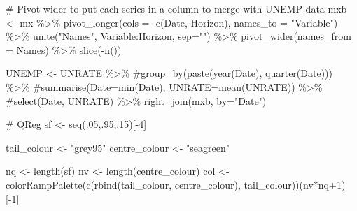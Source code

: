 \documentclass[
  letterpaper,
]{book}
\newenvironment{Shaded}{\begin{snugshade}}{\end{snugshade}}
\newcommand{\AttributeTok}[1]{\textcolor[rgb]{0.40,0.45,0.13}{#1}}
\newcommand{\CommentTok}[1]{\textcolor[rgb]{0.37,0.37,0.37}{#1}}
\newcommand{\DecValTok}[1]{\textcolor[rgb]{0.68,0.00,0.00}{#1}}
\newcommand{\FunctionTok}[1]{\textcolor[rgb]{0.28,0.35,0.67}{#1}}
\newcommand{\NormalTok}[1]{\textcolor[rgb]{0.00,0.23,0.31}{#1}}
\newcommand{\OtherTok}[1]{\textcolor[rgb]{0.00,0.23,0.31}{#1}}
\newcommand{\SpecialCharTok}[1]{\textcolor[rgb]{0.37,0.37,0.37}{#1}}
\newcommand{\StringTok}[1]{\textcolor[rgb]{0.13,0.47,0.30}{#1}}
\begin{document}
\begin{Shaded}
\begin{Highlighting}[]
\CommentTok{\# Pivot wider to put each series in a column to merge with UNEMP data}
\NormalTok{mxb }\OtherTok{\textless{}{-}}\NormalTok{ mx }\SpecialCharTok{\%\textgreater{}\%} 
  \FunctionTok{pivot\_longer}\NormalTok{(}\AttributeTok{cols =} \SpecialCharTok{{-}}\FunctionTok{c}\NormalTok{(Date, Horizon), }\AttributeTok{names\_to =} \StringTok{"Variable"}\NormalTok{) }\SpecialCharTok{\%\textgreater{}\%} 
  \FunctionTok{unite}\NormalTok{(}\StringTok{"Names"}\NormalTok{, Variable}\SpecialCharTok{:}\NormalTok{Horizon, }\AttributeTok{sep=}\StringTok{""}\NormalTok{) }\SpecialCharTok{\%\textgreater{}\%} 
  \FunctionTok{pivot\_wider}\NormalTok{(}\AttributeTok{names\_from =}\NormalTok{ Names) }\SpecialCharTok{\%\textgreater{}\%}
  \FunctionTok{slice}\NormalTok{(}\SpecialCharTok{{-}}\FunctionTok{n}\NormalTok{())}

\NormalTok{UNEMP }\OtherTok{\textless{}{-}}\NormalTok{ UNRATE }\SpecialCharTok{\%\textgreater{}\%} 
  \CommentTok{\#group\_by(paste(year(Date), quarter(Date))) \%\textgreater{}\% }
  \CommentTok{\#summarise(Date=min(Date), UNRATE=mean(UNRATE)) \%\textgreater{}\% }
  \CommentTok{\#select(Date, UNRATE) \%\textgreater{}\% }
  \FunctionTok{right\_join}\NormalTok{(mxb, }\AttributeTok{by=}\StringTok{"Date"}\NormalTok{) }

\CommentTok{\# QReg }
\NormalTok{sf }\OtherTok{\textless{}{-}} \FunctionTok{seq}\NormalTok{(.}\DecValTok{05}\NormalTok{,.}\DecValTok{95}\NormalTok{,.}\DecValTok{15}\NormalTok{)[}\SpecialCharTok{{-}}\DecValTok{4}\NormalTok{]}

\NormalTok{tail\_colour   }\OtherTok{\textless{}{-}} \StringTok{"grey95"}
\NormalTok{centre\_colour }\OtherTok{\textless{}{-}} \StringTok{"seagreen"}

\NormalTok{nq  }\OtherTok{\textless{}{-}} \FunctionTok{length}\NormalTok{(sf)}
\NormalTok{nv  }\OtherTok{\textless{}{-}} \FunctionTok{length}\NormalTok{(centre\_colour)}
\NormalTok{col }\OtherTok{\textless{}{-}} \FunctionTok{colorRampPalette}\NormalTok{(}\FunctionTok{c}\NormalTok{(}\FunctionTok{rbind}\NormalTok{(tail\_colour, centre\_colour), tail\_colour))(nv}\SpecialCharTok{*}\NormalTok{nq}\SpecialCharTok{+}\DecValTok{1}\NormalTok{)[}\SpecialCharTok{{-}}\DecValTok{1}\NormalTok{]}


\end{Highlighting}
\end{Shaded}
\end{document}
